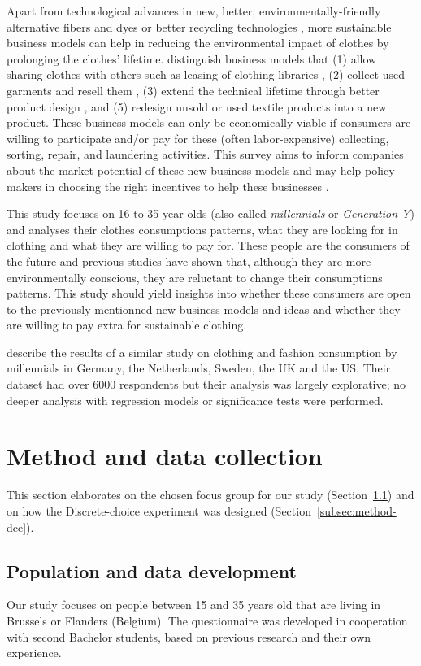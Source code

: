 \documentclass[review]{elsarticle}
\begin{document}
Apart from technological advances in new, better, environmentally-friendly alternative fibers and dyes \citep{A.R.Bunsell2018,Shahid2013} or better recycling technologies \citep{Woolridge2006}, more sustainable business models can help in reducing the environmental impact of clothes by prolonging the clothes' lifetime. \citep{Elander2017} distinguish business models that (1) allow sharing clothes with others such as leasing of clothing libraries \citep{Pedersen2015,Zamani2017}, (2) collect used garments and resell them \citep{Farrant2010}, (3) extend the technical lifetime through better product design , and (5) redesign unsold or used textile products into a new product. These business models can only be economically viable if consumers are willing to participate and/or pay for these (often labor-expensive) collecting, sorting, repair, and laundering activities. This survey aims to inform companies about the market potential of these new business models and may help policy makers in choosing the right incentives to help these businesses \citep{Watson2017}.

This study focuses on 16-to-35-year-olds (also called \emph{millennials} or \emph{Generation Y}) and analyses their clothes consumptions patterns, what they are looking for in clothing and what they are willing to pay for. These people are the consumers of the future and previous studies have shown that, although they are more environmentally conscious, they are reluctant to change their consumptions patterns. This study should yield insights into whether these consumers are open to the previously mentionned new business models and ideas and whether they are willing to pay extra for sustainable clothing.

\cite{Farsang2014} describe the results of a similar study on clothing and fashion consumption by millennials in  Germany, the Netherlands, Sweden, the UK and the US. Their dataset had over 6000 respondents but their analysis was largely explorative; no deeper analysis with regression models or significance tests were performed.

\section{Method and data collection}\label{sec:method}
This section elaborates on the chosen focus group for our study (Section~\ref{subsec:method-data}) and on how the Discrete-choice experiment was designed (Section~\ref{subsec:method-dce}).

\subsection{Population and data development}\label{subsec:method-data}
Our study focuses on people between 15 and 35 years old that are living in Brussels or Flanders (Belgium). The questionnaire was developed in cooperation with second Bachelor students, based on previous research and their own experience. 
\end{document}
